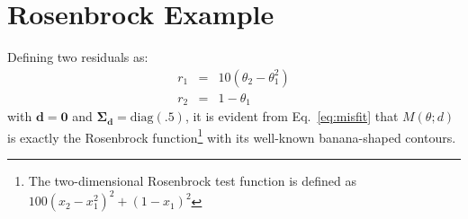 \section{Rosenbrock Example} \label{uq:bayes:ex}

Defining two residuals as:
\begin{eqnarray}
r_1 &=& 10 (\theta_2 - \theta_1^2) \label{eq:rosen_r1} \\
r_2 &=& 1 - \theta_1 \label{eq:rosen_r2}
\end{eqnarray}
with $\boldsymbol{d} = \boldsymbol{0}$ and $\boldsymbol{\Sigma_d} =
\text{diag}(\boldsymbol{.5})$, it is evident from Eq.~\ref{eq:misfit}
that $M(\theta;d)$ is exactly the Rosenbrock function\footnote{The
  two-dimensional Rosenbrock test function is defined as $100 (x_2 -
  x_1^2)^2 + (1 - x_1)^2$} with its well-known banana-shaped contours.

